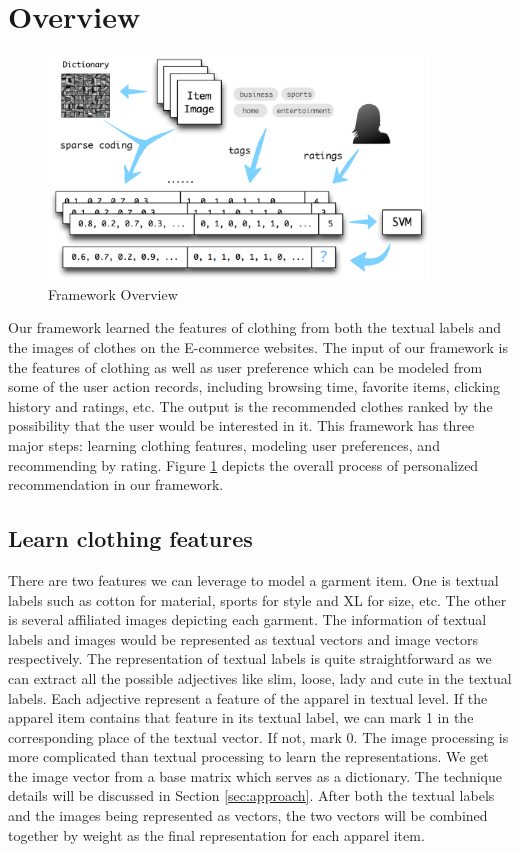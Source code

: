 \section{Overview}\label{sec:overview}

\begin{figure}
  \centering
  \includegraphics[width=0.9\textwidth]{framework}
  \caption{Framework Overview}
  \label{fig:overview}
\end{figure}

Our framework learned the features of clothing from both the textual labels and the images of clothes on the E-commerce websites. The input of our framework is the features of clothing as well as user preference which can be modeled from some of the user action records, including browsing time, favorite items, clicking history and ratings, etc. The output is the recommended clothes ranked by the possibility that the user would be interested in it. This framework has three major steps: learning clothing features,
modeling user preferences, and recommending by rating. Figure \ref{fig:overview} depicts the overall process of personalized recommendation in our framework.

\subsection{Learn clothing features}
There are two features we can leverage to model a garment item. One is textual labels such as cotton for material, sports for style and XL for size, etc. The other is several affiliated images depicting each garment. The information of textual labels and images would be represented as textual vectors and image vectors respectively. The representation of textual labels is quite straightforward as we can extract all the possible adjectives like slim, loose, lady and cute in the textual
labels. Each adjective represent a feature of the apparel in textual level. If the apparel item contains that feature in its textual label, we can mark 1 in the corresponding place of the textual vector. If not, mark 0. The image processing is more complicated than textual processing to learn the representations. We get the image vector from a base matrix which serves as a dictionary. The technique details will be discussed in Section \ref{sec:approach}. After both the textual labels
and the images being represented as vectors, the two vectors will be combined together by weight as the final representation for each apparel item.

